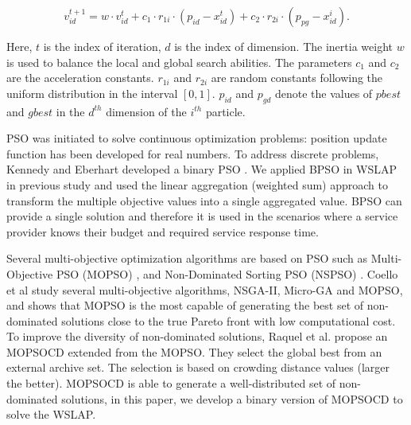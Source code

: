 \documentclass[10pt,journal,compsoc]{IEEEtran}
\begin{document}
\vspace{-3 mm}

\begin{equation}
\label{eq:updateVelocity}
 v^{t+1}_{id} = w \cdot v^{t}_{id} + c_1 \cdot r_{1i} \cdot (p_{id} - x^t_{id}) + c_2 \cdot r_{2i} \cdot (p_{pg} - x^i_{id}).
\end{equation}
\normalsize

Here, $t$ is the index of iteration, $d$ is the index of dimension. The inertia weight $w$ is used to balance the local and global search abilities. The parameters $c_1$ and $c_2$ are the acceleration constants. $r_{1i}$ and $r_{2i}$ are random constants following the uniform distribution in the interval $[0, 1]$. $p_{id}$ and $p_{gd}$ denote the values of $pbest$ and $gbest$ in the $d^{th}$ dimension of the $i^{th}$ particle.

PSO was initiated to solve continuous optimization problems: position update function has been developed for real numbers. 
To address discrete problems, Kennedy and Eberhart developed a binary PSO \cite{Kennedy:1997hd}. We applied BPSO in WSLAP in previous study \cite{Tan2016a} and used the linear aggregation (weighted sum) approach to transform the multiple objective values into a single aggregated value.
BPSO can provide a single solution and therefore it is used in the scenarios where a service provider knows their budget and required service response time. 

Several multi-objective optimization algorithms are based on PSO such as Multi-Objective PSO (MOPSO) \cite{1304847}, and Non-Dominated Sorting PSO (NSPSO) \cite{NSPSO}. Coello et al \cite{1304847} study several multi-objective algorithms, NSGA-II, Micro-GA \cite{Micro} and MOPSO, and shows that MOPSO is the most capable of generating the best set of non-dominated solutions close to the true Pareto front with low computational cost. To improve the diversity of non-dominated solutions, Raquel et al. \cite{Raquel} propose an MOPSOCD extended from the MOPSO. They select the global best from an external archive set. The selection is based on crowding distance values (larger the better). MOPSOCD is able to generate a well-distributed set of non-dominated solutions, in this paper, we develop a binary version of MOPSOCD to solve the WSLAP.
\end{document}

